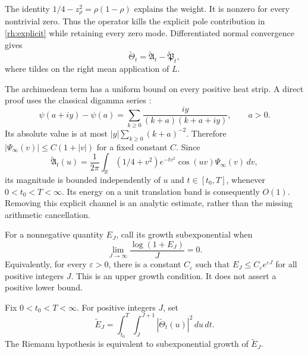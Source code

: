 The identity \(1/4-z_\rho^2=\rho(1-\rho)\) explains the weight. It is nonzero for every nontrivial zero. Thus the operator kills the explicit pole contribution in \eqref{rh:explicit} while retaining every zero mode. Differentiated normal convergence gives
\begin{equation}\label{rh:tildeexplicit}
\widetilde\Theta_t=\widetilde{\mathfrak A}_t-
\widetilde{\mathfrak P}_t,
\end{equation}
where tildes on the right mean application of \(L\).

The archimedean term has a uniform bound on every positive heat strip. A direct proof uses the classical digamma series \cite{DLMFDigamma}:
\[
\psi(a+iy)-\psi(a)=
\sum_{k\ge0}\frac{iy}{(k+a)(k+a+iy)},
\qquad a>0.
\]
Its absolute value is at most \(|y|\sum_{k\ge0}(k+a)^{-2}\). Therefore \(|\Psi_\infty(v)|\le C(1+|v|)\) for a fixed constant \(C\). Since
\[
\widetilde{\mathfrak A}_t(u)=\frac1{2\pi}
\int_{\mathbb R}(1/4+v^2)e^{-tv^2}\cos(uv)
\Psi_\infty(v)\,dv,
\]
its magnitude is bounded independently of \(u\) and \(t\in[t_0,T]\), whenever \(0<t_0<T<\infty\). Its energy on a unit translation band is consequently \(O(1)\). Removing this explicit channel is an analytic estimate, rather than the missing arithmetic cancellation.

For a nonnegative quantity \(E_J\), call its growth subexponential when
\begin{equation}\label{rh:subexp}
\lim_{J\to\infty}\frac{\log(1+E_J)}J=0.
\end{equation}
Equivalently, for every \(\varepsilon>0\), there is a constant
\(C_\varepsilon\) such that \(E_J\le C_\varepsilon e^{\varepsilon J}\)
for all positive integers \(J\). This is an upper growth condition. It does
not assert a positive lower bound.

\begin{theorem}\label{rh:energy}
Fix \(0<t_0<T<\infty\). For positive integers \(J\), set
\begin{equation}\label{rh:energydef}
\widetilde E_J=\int_{t_0}^T\int_J^{J+1}
|\widetilde\Theta_t(u)|^2\,du\,dt.
\end{equation}
The Riemann hypothesis is equivalent to subexponential growth of \(\widetilde E_J\).
\end{theorem}

